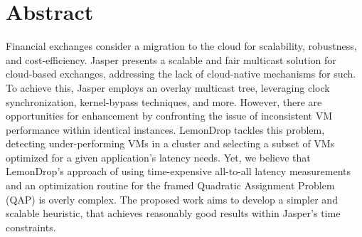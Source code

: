 \thispagestyle{plain}

\section*{Abstract}
Financial exchanges consider a migration to the cloud for scalability, robustness, and cost-efficiency.
Jasper presents a scalable and fair multicast solution for cloud-based exchanges, 
addressing the lack of cloud-native mechanisms for such. 
To achieve this, Jasper employs an overlay multicast tree, leveraging clock synchronization, kernel-bypass techniques, 
and more.
However, there are opportunities for enhancement by confronting the issue of inconsistent VM performance 
within identical instances. LemonDrop tackles this problem, detecting under-performing VMs in a cluster 
and selecting a subset of VMs optimized for a given application's latency needs.
Yet, we believe that LemonDrop's approach of using time-expensive all-to-all latency measurements and an optimization routine 
for the framed Quadratic Assignment Problem (QAP) is overly complex. 
The proposed work aims to develop a simpler and scalable heuristic, that achieves reasonably good results
within Jasper's time constraints. 


